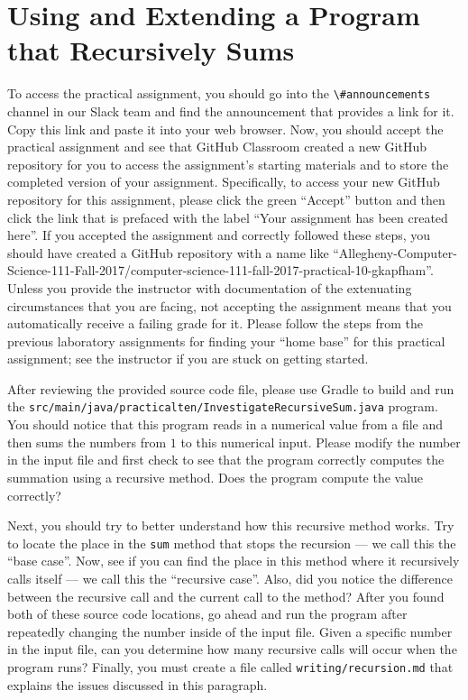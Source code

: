 \documentclass[11pt]{article}
\newcommand{\mainprogramsource}{\lstinline{src/main/java/practicalten/InvestigateRecursiveSum.java}}
\newcommand{\reflection}{\lstinline{writing/recursion.md}}
\newcommand{\channel}[1]{\lstinline{#1}}
\begin{document}
\section*{Using and Extending a Program that Recursively Sums}

To access the practical assignment, you should go into the \channel{\#announcements} channel in our Slack team and find
the announcement that provides a link for it. Copy this link and paste it into your web browser. Now, you should accept
the practical assignment and see that GitHub Classroom created a new GitHub repository for you to access the
assignment's starting materials and to store the completed version of your assignment. Specifically, to access your new
GitHub repository for this assignment, please click the green ``Accept'' button and then click the link that is prefaced
with the label ``Your assignment has been created here''. If you accepted the assignment and correctly followed these
steps, you should have created a GitHub repository with a name like
``Allegheny-Computer-Science-111-Fall-2017/computer-science-111-fall-2017-practical-10-gkapfham''. Unless you provide the
instructor with documentation of the extenuating circumstances that you are facing, not accepting the assignment means
that you automatically receive a failing grade for it. Please follow the steps from the previous laboratory assignments
for finding your ``home base'' for this practical assignment; see the instructor if you are stuck on getting started.

After reviewing the provided source code file, please use Gradle to build and
run the \mainprogramsource{} program. You should notice that this program reads
in a numerical value from a file and then sums the numbers from $1$ to this
numerical input. Please modify the number in the input file and first check to
see that the program correctly computes the summation using a recursive method.
Does the program compute the value correctly?

Next, you should try to better understand how this recursive method works. Try
to locate the place in the {\tt sum} method that stops the recursion --- we call
this the ``base case''. Now, see if you can find the place in this method where
it recursively calls itself --- we call this the ``recursive case''. Also, did
you notice the difference between the recursive call and the current call to the
method? After you found both of these source code locations, go ahead and run
the program after repeatedly changing the number inside of the input file. Given
a specific number in the input file, can you determine how many recursive calls
will occur when the program runs? Finally, you must create a file called
\reflection{} that explains the issues discussed in this paragraph.
\end{document}
